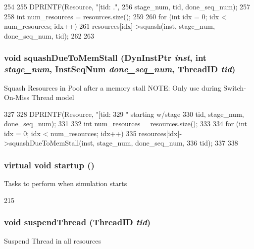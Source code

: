 \begin{DoxyCode}
254 {
255     DPRINTF(Resource, "[tid:%
      .\n",
256             stage_num, tid, done_seq_num);
257 
258     int num_resources = resources.size();
259 
260     for (int idx = 0; idx < num_resources; idx++) {
261         resources[idx]->squash(inst, stage_num, done_seq_num, tid);
262     }
263 }
\end{DoxyCode}
\hypertarget{classResourcePool_ae8f7628b42285a715d374b5a04f241e4}{
\subsubsection[{squashDueToMemStall}]{\setlength{\rightskip}{0pt plus 5cm}void squashDueToMemStall ({\bf DynInstPtr} {\em inst}, \/  int {\em stage\_\-num}, \/  {\bf InstSeqNum} {\em done\_\-seq\_\-num}, \/  {\bf ThreadID} {\em tid})}}
\label{classResourcePool_ae8f7628b42285a715d374b5a04f241e4}
Squash Resources in Pool after a memory stall NOTE: Only use during Switch-\/On-\/Miss Thread model 


\begin{DoxyCode}
327 {
328     DPRINTF(Resource, "[tid:%
329             " starting w/stage %
330             tid, stage_num, done_seq_num);
331 
332     int num_resources = resources.size();
333 
334     for (int idx = 0; idx < num_resources; idx++) {
335         resources[idx]->squashDueToMemStall(inst, stage_num, done_seq_num, 
336                                             tid);
337     }
338 }
\end{DoxyCode}
\hypertarget{classResourcePool_a86b760932b88a9cebef1df8514818390}{
\subsubsection[{startup}]{\setlength{\rightskip}{0pt plus 5cm}virtual void startup ()}}
\label{classResourcePool_a86b760932b88a9cebef1df8514818390}
Tasks to perform when simulation starts 


\begin{DoxyCode}
215 { }
\end{DoxyCode}
\hypertarget{classResourcePool_aee7a498a20266fbfbc6aa3f165577b68}{
\subsubsection[{suspendThread}]{\setlength{\rightskip}{0pt plus 5cm}void suspendThread ({\bf ThreadID} {\em tid})}}
\label{classResourcePool_aee7a498a20266fbfbc6aa3f165577b68}
Suspend Thread in all resources 


